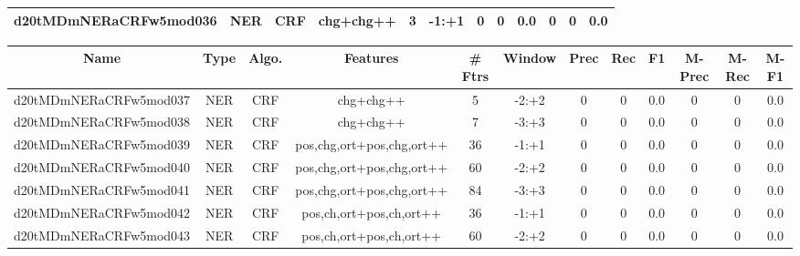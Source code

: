 \documentclass[a4paper]{article}
\begin{document}
\begin{landscape}
\begin{center}
\begin{tabular}{ |c|c|c|c|c|c|c|c|c|c|c|c|}
 
 	
 	\small{ d20tMDmNERaCRFw5mod036 } & \small{ NER} & \small{  CRF }  & chg+chg++  &  3 &  \small{  -1:+1 }  &  0 & 0 & 0.0  &  0 & 0 & 0.0 \\
 	
 \hline
\end{tabular}
\end{center}




\begin{center}
\begin{tabular}{ |c|c|c|c|c|c|c|c|c|c|c|c|} 
 \hline
 	Name & Type & Algo. & Features & \# Ftrs & Window & Prec & Rec & F1 & M-Prec & M-Rec & M-F1\\
 \hline

 	

 
 	
 	\small{ d20tMDmNERaCRFw5mod037 } & \small{ NER} & \small{  CRF }  & chg+chg++  &  5 &  \small{  -2:+2 }  &  0 & 0 & 0.0  &  0 & 0 & 0.0 \\
 	

 
 	
 	\small{ d20tMDmNERaCRFw5mod038 } & \small{ NER} & \small{  CRF }  & chg+chg++  &  7 &  \small{  -3:+3 }  &  0 & 0 & 0.0  &  0 & 0 & 0.0 \\
 	

 
 	
 	\small{ d20tMDmNERaCRFw5mod039 } & \small{ NER} & \small{  CRF }  & pos,chg,ort+pos,chg,ort++  &  36 &  \small{  -1:+1 }  &  0 & 0 & 0.0  &  0 & 0 & 0.0 \\
 	

 
 	
 	\small{ d20tMDmNERaCRFw5mod040 } & \small{ NER} & \small{  CRF }  & pos,chg,ort+pos,chg,ort++  &  60 &  \small{  -2:+2 }  &  0 & 0 & 0.0  &  0 & 0 & 0.0 \\
 	

 
 	
 	\small{ d20tMDmNERaCRFw5mod041 } & \small{ NER} & \small{  CRF }  & pos,chg,ort+pos,chg,ort++  &  84 &  \small{  -3:+3 }  &  0 & 0 & 0.0  &  0 & 0 & 0.0 \\
 	

 
 	
 	\small{ d20tMDmNERaCRFw5mod042 } & \small{ NER} & \small{  CRF }  & pos,ch,ort+pos,ch,ort++  &  36 &  \small{  -1:+1 }  &  0 & 0 & 0.0  &  0 & 0 & 0.0 \\
 	

 
 	
 	\small{ d20tMDmNERaCRFw5mod043 } & \small{ NER} & \small{  CRF }  & pos,ch,ort+pos,ch,ort++  &  60 &  \small{  -2:+2 }  &  0 & 0 & 0.0  &  0 & 0 & 0.0 \\
 	


\end{tabular}
\end{center}
\end{landscape}
\end{document}
